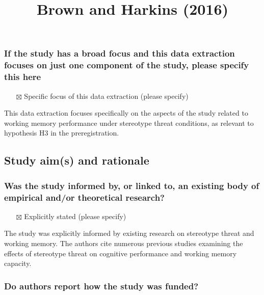 \documentclass[
  doc, a4paper]{apa7}
\title{Brown and Harkins (2016)}
\author{\phantom{0}}
\date{}
\affiliation{\phantom{0}}
\providecommand{\tightlist}{%
  \setlength{\itemsep}{0pt}\setlength{\parskip}{0pt}}
\begin{document}
\maketitle

\subsubsection{If the study has a broad focus and this data extraction focuses on just one component of the study, please specify this here}\label{if-the-study-has-a-broad-focus-and-this-data-extraction-focuses-on-just-one-component-of-the-study-please-specify-this-here}

\begin{itemize}
\tightlist
\item[$\boxtimes$]
  Specific focus of this data extraction (please specify)
\end{itemize}

This data extraction focuses specifically on the aspects of the study related to working memory performance under stereotype threat conditions, as relevant to hypothesis H3 in the preregistration.

\subsection{Study aim(s) and rationale}\label{study-aims-and-rationale}

\subsubsection{Was the study informed by, or linked to, an existing body of empirical and/or theoretical research?}\label{was-the-study-informed-by-or-linked-to-an-existing-body-of-empirical-andor-theoretical-research}

\begin{itemize}
\tightlist
\item[$\boxtimes$]
  Explicitly stated (please specify)
\end{itemize}

The study was explicitly informed by existing research on stereotype threat and working memory. The authors cite numerous previous studies examining the effects of stereotype threat on cognitive performance and working memory capacity.

\subsubsection{Do authors report how the study was funded?}\label{do-authors-report-how-the-study-was-funded}
\end{document}
